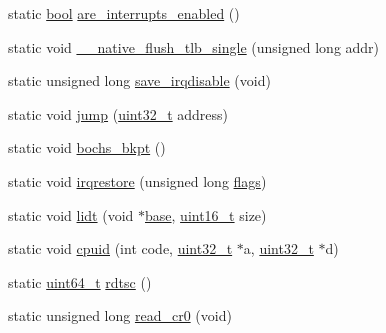 \begin{DoxyCompactItemize}
\item 
static \hyperlink{a00095_af6a258d8f3ee5206d682d799316314b1_af6a258d8f3ee5206d682d799316314b1}{bool} \hyperlink{a00104_ae7df27a6150c6a020eead928af349b21_ae7df27a6150c6a020eead928af349b21}{are\+\_\+interrupts\+\_\+enabled} ()
\item 
static void \hyperlink{a00104_ad80d786594a109b21e30da4bf6f56a85_ad80d786594a109b21e30da4bf6f56a85}{\+\_\+\+\_\+native\+\_\+flush\+\_\+tlb\+\_\+single} (unsigned long addr)
\item 
static unsigned long \hyperlink{a00104_ab1dca2d7fd57d56f7548a81ef081ba74_ab1dca2d7fd57d56f7548a81ef081ba74}{save\+\_\+irqdisable} (void)
\item 
static void \hyperlink{a00104_aa090eac3bad049e35e9360403f42b565_aa090eac3bad049e35e9360403f42b565}{jump} (\hyperlink{a00095_a435d1572bf3f880d55459d9805097f62_a435d1572bf3f880d55459d9805097f62}{uint32\+\_\+t} address)
\item 
static void \hyperlink{a00104_a3f7e7be8f62f43b2b62df54cac1590be_a3f7e7be8f62f43b2b62df54cac1590be}{bochs\+\_\+bkpt} ()
\item 
static void \hyperlink{a00104_a7dd6b2cd918b8cbca3c8b0381628ca83_a7dd6b2cd918b8cbca3c8b0381628ca83}{irqrestore} (unsigned long \hyperlink{a00068_aa2585d779da0ab21273a8d92de9a0ebe_aa2585d779da0ab21273a8d92de9a0ebe}{flags})
\item 
static void \hyperlink{a00104_a31967dec32575d3d398e6d289e888d1f_a31967dec32575d3d398e6d289e888d1f}{lidt} (void $\ast$\hyperlink{a00068_a0523cedff47e2441fc198b7770ec5d3f_a0523cedff47e2441fc198b7770ec5d3f}{base}, \hyperlink{a00095_a273cf69d639a59973b6019625df33e30_a273cf69d639a59973b6019625df33e30}{uint16\+\_\+t} size)
\item 
static void \hyperlink{a00104_adacb2a50c30267ac5314bfcb92ac1d85_adacb2a50c30267ac5314bfcb92ac1d85}{cpuid} (int code, \hyperlink{a00095_a435d1572bf3f880d55459d9805097f62_a435d1572bf3f880d55459d9805097f62}{uint32\+\_\+t} $\ast$a, \hyperlink{a00095_a435d1572bf3f880d55459d9805097f62_a435d1572bf3f880d55459d9805097f62}{uint32\+\_\+t} $\ast$d)
\item 
static \hyperlink{a00095_aa232ecf786a74ce5363c36c10798d2b1_aa232ecf786a74ce5363c36c10798d2b1}{uint64\+\_\+t} \hyperlink{a00104_a47b9d70be3022fd0b5687d9794ca47bc_a47b9d70be3022fd0b5687d9794ca47bc}{rdtsc} ()
\item 
static unsigned long \hyperlink{a00104_ac85e095222f364961e091702bb6bc2ff_ac85e095222f364961e091702bb6bc2ff}{read\+\_\+cr0} (void)
\item 

\end{DoxyCompactItemize}
